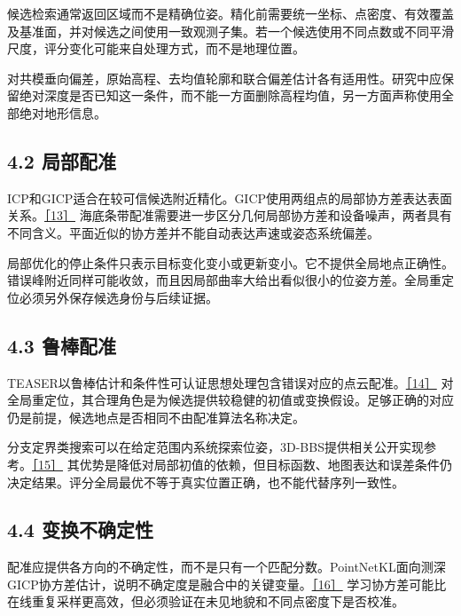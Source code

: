候选检索通常返回区域而不是精确位姿。精化前需要统一坐标、点密度、有效覆盖及基准面，并对候选之间使用一致观测子集。若一个候选使用不同点数或不同平滑尺度，评分变化可能来自处理方式，而不是地理位置。

对共模垂向偏差，原始高程、去均值轮廓和联合偏差估计各有适用性。研究中应保留绝对深度是否已知这一条件，而不能一方面删除高程均值，另一方面声称使用全部绝对地形信息。

\hypertarget{ux5c40ux90e8ux914dux51c6}{%
\subsection{4.2 局部配准}\label{ux5c40ux90e8ux914dux51c6}}

ICP和GICP适合在较可信候选附近精化。GICP使用两组点的局部协方差表达表面关系。\href{https://www.robots.ox.ac.uk/~avsegal/resources/papers/Generalized_ICP.pdf}{［13］} 海底条带配准需要进一步区分几何局部协方差和设备噪声，两者具有不同含义。平面近似的协方差并不能自动表达声速或姿态系统偏差。

局部优化的停止条件只表示目标变化变小或更新变小。它不提供全局地点正确性。错误峰附近同样可能收敛，而且因局部曲率大给出看似很小的位姿方差。全局重定位必须另外保存候选身份与后续证据。

\hypertarget{ux9c81ux68d2ux914dux51c6}{%
\subsection{4.3 鲁棒配准}\label{ux9c81ux68d2ux914dux51c6}}

TEASER以鲁棒估计和条件性可认证思想处理包含错误对应的点云配准。\href{https://arxiv.org/abs/2001.07715}{［14］} 对全局重定位，其合理角色是为候选提供较稳健的初值或变换假设。足够正确的对应仍是前提，候选地点是否相同不由配准算法名称决定。

分支定界类搜索可以在给定范围内系统探索位姿，3D-BBS提供相关公开实现参考。\href{https://arxiv.org/abs/2310.10023}{［15］} 其优势是降低对局部初值的依赖，但目标函数、地图表达和误差条件仍决定结果。评分全局最优不等于真实位置正确，也不能代替序列一致性。

\hypertarget{ux53d8ux6362ux4e0dux786eux5b9aux6027}{%
\subsection{4.4 变换不确定性}\label{ux53d8ux6362ux4e0dux786eux5b9aux6027}}

配准应提供各方向的不确定性，而不是只有一个匹配分数。PointNetKL面向测深GICP协方差估计，说明不确定度是融合中的关键变量。\href{https://arxiv.org/abs/2003.10931}{［16］} 学习协方差可能比在线重复采样更高效，但必须验证在未见地貌和不同点密度下是否校准。

